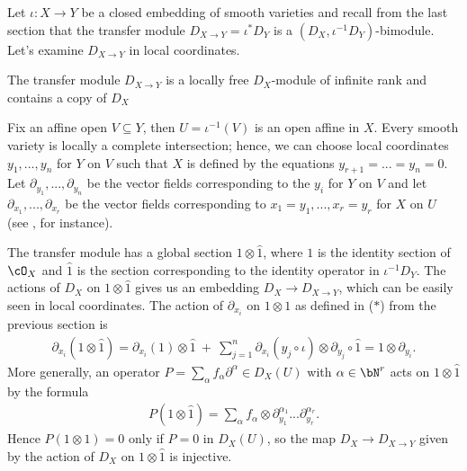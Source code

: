 Let $\iota:X\to Y$ be a closed embedding of smooth varieties and recall from the last section that the transfer module $D_{X\to Y} = \iota^*D_Y$ is a $(D_X,\iota^{-1}D_Y)$-bimodule. Let's examine $D_{X\to Y}$ in local coordinates.
\begin{lem}\label{lem:transfer-module-locally-free}
	The transfer module $D_{X\to Y}$ is a locally free $D_X$-module of infinite rank and contains a copy of $D_X$
\end{lem}
\begin{prf}
	Fix an affine open $V\subseteq Y$, then $U = \iota^{-1}(V)$ is an open affine in $X$. Every smooth variety is locally a complete intersection; hence, we can choose local coordinates $y_1,...,y_n$ for $Y$ on $V$ such that $X$ is defined by the equations $y_{r+1} = ... = y_n = 0$. Let $\partial_{y_1},...,\partial_{y_n}$ be the vector fields corresponding to the $y_i$ for $Y$ on $V$ and let $\partial_{x_1},...,\partial_{x_r}$ be the vector fields corresponding to $x_1 = y_1,...,x_r = y_r$ for $X$ on $U$ (see \cite[Theorem A.5.3]{d-mod_ps-rt}, for instance).

	The transfer module has a global section $1\otimes \hat{1}$, where $1$ is the identity section of $\cO_X$ and $\hat{1}$ is the section corresponding to the identity operator in $\iota^{-1}D_Y$. The actions of $D_X$ on $1\otimes \hat{1}$ gives us an embedding $D_X \to D_{X\to Y}$, which can be easily seen in local coordinates. The action of $\partial_{x_i}$ on $1\otimes 1$ as defined in ($\ast$) from the previous section is
	\begin{align*}
		\partial_{x_i}(1\otimes \hat{1}) = \partial_{x_i}(1)\otimes \hat{1} ~+~ \sum_{j=1}^n \partial_{x_i}(y_j\circ \iota)\otimes \partial_{y_j}\circ \hat{1} = 1\otimes \partial_{y_i}.
	\end{align*}
	More generally, an operator $P = \sum_\alpha f_\alpha \partial^\alpha \in D_X(U)$ with $\alpha \in \bN^r$ acts on $1\otimes \hat{1}$ by the formula
	\begin{align*}
		P(1\otimes \hat{1}) = \sum_{\alpha} f_\alpha \otimes \partial_{y_1}^{\alpha_1}...\partial_{y_r}^{\alpha_r}.
	\end{align*}
	Hence $P(1\otimes 1) = 0$ only if $P = 0$ in $D_X(U)$, so the map $D_X\to D_{X\to Y}$ given by the action of $D_X$ on $1\otimes \hat{1}$ is injective.


\end{prf}

